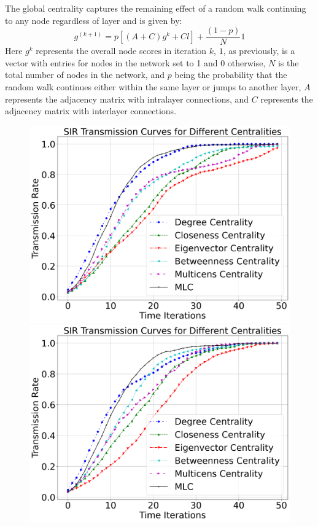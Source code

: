 \documentclass[10pt,letterpaper]{article}
\begin{document}
The global centrality captures the remaining effect of a random walk continuing to any node regardless of layer and is given by:
\[
g^{(k+1)}=p[(A+C)g^{k} + Cl]+\frac{(1-p)}{N}1
\]
Here $g^{k}$ represents the overall node scores in iteration $k$, $1$, as previously, is a vector with entries for nodes in the network set to 1 and 0 otherwise, $N$ is the total number of nodes in the network, and $p$ being the probability that the random walk continues either within the same layer or jumps to another layer, $A$ represents the adjacency matrix with intralayer connections, and $C$ represents the adjacency matrix with interlayer connections. 


\begin{figure}[h!]
\centering
\begin{minipage}[b]{0.25\linewidth}
\centering
\includegraphics[width=\textwidth]{figs/fig17-ahr_arnt-k1top2.png}
\subcaption{}
\end{minipage}
\hspace{0.5cm}
\begin{minipage}[b]{0.25\linewidth}
\centering
\includegraphics[width=\textwidth]{figs/fig18-clock_bmal1-k2top2.png}

\end{minipage}
\end{figure}
\end{document}
